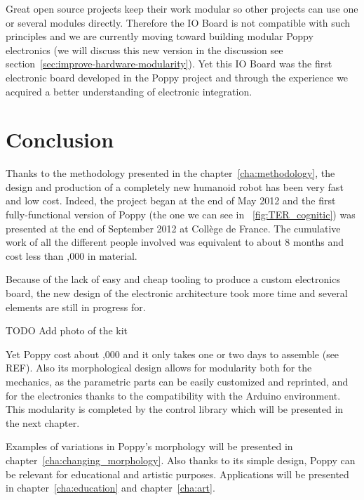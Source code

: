 Great open source projects keep their work modular so other projects can use one or several modules directly. Therefore the IO Board is not compatible with such principles and we are currently moving toward building modular Poppy electronics (we will discuss this new version in the discussion see section~\ref{sec:improve-hardware-modularity}). Yet this IO Board was the first electronic board developed in the Poppy project and through the experience we acquired a better understanding of electronic integration.



\section{Conclusion} %

Thanks to the methodology presented in the chapter~\ref{cha:methodology}, the design and production of a completely new humanoid robot has been very fast and low cost. Indeed, the project began at the end of May 2012 and the first fully-functional version of Poppy (the one we can see in \figurename~\ref{fig:TER_cognitic}) was presented at the end of September 2012 at Collège de France. The cumulative work of all the different people involved was equivalent to about 8 months and cost less than ,000 in material.

Because of the lack of easy and cheap tooling to produce a custom electronics board, the new design of the electronic architecture took more time and several elements are still in progress for.

TODO Add photo of the kit

Yet Poppy cost about ,000 and it only takes one or two days to assemble (see REF). Also its morphological design allows for modularity both for the mechanics, as the parametric parts can be easily customized and reprinted, and for the electronics thanks to the compatibility with the Arduino environment. This modularity is completed by the control library which will be presented in the next chapter.

Examples of variations in Poppy’s morphology will be presented in chapter~\ref{cha:changing_morphology}. Also thanks to its simple design, Poppy can be relevant for educational and artistic purposes. Applications will be presented in chapter~\ref{cha:education} and chapter~\ref{cha:art}.







